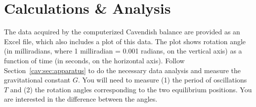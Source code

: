 \section{Calculations \& Analysis}

The data acquired by the computerized Cavendish balance are provided as an Excel file,
which also includes a plot of this data. The plot shows rotation angle (in milliradians, where 1 milliradian =
0.001 radians, on the vertical axis) as a function of time (in seconds, on the horizontal axis). Follow
Section~\ref{cav:sec:apparatus} to do the necessary data analysis and measure the gravitational constant $G$. You
will need to measure (1) the period of oscillations $T$ and (2) the rotation angles
corresponding to the two equilibrium positions. You are interested in the difference
between the angles.
